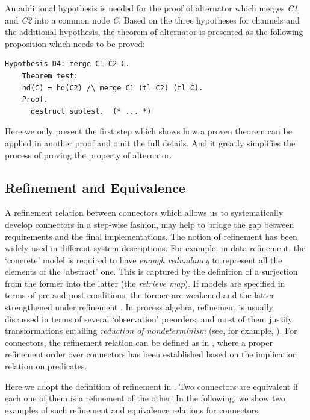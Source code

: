 \documentclass[preprint,3p]{elsarticle}
\begin{document}

An additional hypothesis is needed for the proof of alternator which merges \emph{C1} and \emph{C2} into a common node \emph{C}. Based on the three
hypotheses for channels and the additional hypothesis, the theorem of alternator is presented as the following proposition which needs to be proved:
\begin{lstlisting}[language=coq]
    Hypothesis D4: merge C1 C2 C.
    Theorem test:
    hd(C) = hd(C2) /\ merge C1 (tl C2) (tl C).
    Proof.
      destruct subtest.  (* ... *)
\end{lstlisting}
Here we only present the first step which shows how a proven theorem can be applied in another proof and omit the full details. %
And it greatly simplifies the process of proving the property of alternator.


\subsection{Refinement and Equivalence}

A refinement relation between connectors which allows us to systematically develop connectors in a step-wise fashion, may help to bridge
the gap between requirements and the final implementations. The notion of refinement has been widely used in different system descriptions.
For example, in data refinement\cite{RE98}, the `concrete' model is required to have \emph{enough redundancy} to represent all the elements
of the `abstract' one. This is captured by the definition of a surjection from the former into the latter (the \emph{retrieve map}). If
models are specified in terms of pre and post-conditions, the former are weakened and the latter strengthened under refinement \cite{Jon90}.
In process algebra, refinement is usually discussed in terms of several `observation' preorders, and most of them justify
transformations entailing \emph{reduction of nondeterminism} (see, for
example, \cite{Ros98}). For connectors, the refinement relation can be
defined as in \cite{SAA+12}, where a proper refinement order over
connectors has been established based on the implication relation on
predicates.

Here we adopt the definition of refinement in \cite{SAA+12}. Two connectors are equivalent if each one of them is a refinement of the other.
In the following, we show two examples of such refinement and equivalence relations for connectors.
\end{document}
